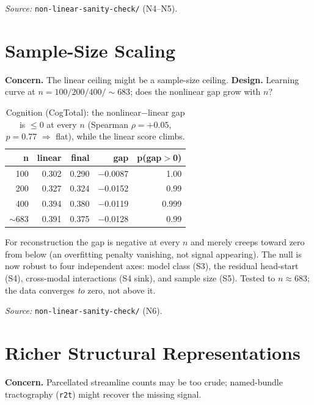 \documentclass{article}
\begin{document}
\noindent\emph{Source:} \texttt{non-linear-sanity-check/} (N4--N5).

\FloatBarrier
\section{Sample-Size Scaling}

\textbf{Concern.} The linear ceiling might be a sample-size ceiling.
\textbf{Design.} Learning curve at $n=100/200/400/{\sim}683$; does the nonlinear gap grow with
$n$?

\begin{table}[h]
\centering\small
\caption{Cognition (CogTotal): the nonlinear$-$linear gap is $\le 0$ at every $n$
(Spearman $\rho=+0.05$, $p=0.77$ $\Rightarrow$ flat), while the linear score climbs.}
\begin{tabular}{@{}rrrrr@{}}
\toprule
\textbf{n} & \textbf{linear} & \textbf{final} & \textbf{gap} & \textbf{p(gap$>$0)} \\
\midrule
100 & 0.302 & 0.290 & $-$0.0087 & 1.00 \\
200 & 0.327 & 0.324 & $-$0.0152 & 0.99 \\
400 & 0.394 & 0.380 & $-$0.0119 & 0.999 \\
$\sim$683 & 0.391 & 0.375 & $-$0.0128 & 0.99 \\
\bottomrule
\end{tabular}
\end{table}

For reconstruction the gap is negative at every $n$ and merely creeps toward zero from below
(an overfitting penalty vanishing, not signal appearing). The null is now robust to four
independent axes: model class (S3), the residual head-start (S4), cross-modal interactions
(S4 sink), and sample size (S5). Tested to $n\approx683$; the data converges \emph{to} zero,
not above it.

\noindent\emph{Source:} \texttt{non-linear-sanity-check/} (N6).

\FloatBarrier
\section{Richer Structural Representations}

\textbf{Concern.} Parcellated streamline counts may be too crude; named-bundle tractography
(\texttt{r2t}) might recover the missing signal.
\end{document}
